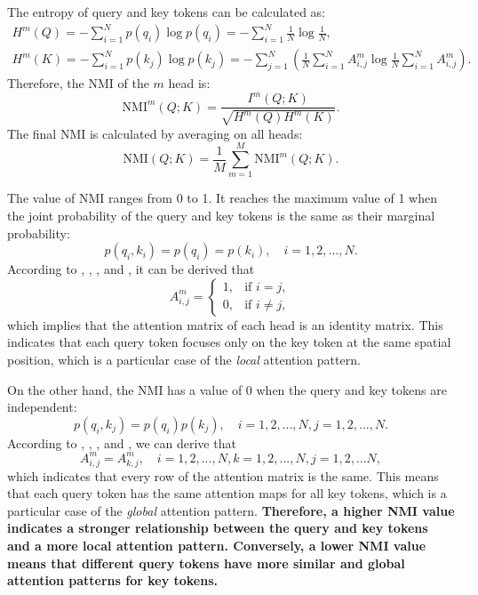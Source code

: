 The entropy of query and key tokens can be calculated as:
\begin{gather}
    H^m(Q)=-\sum_{i=1}^N p(q_i)\log{p(q_i)}=-\sum_{i=1}^N\frac{1}{N}\log{\frac{1}{N}}, \\
    H^m(K)=-\sum_{i=1}^N p(k_j)\log{p(k_j)}=-\sum_{j=1}^N\left(\frac{1}{N}\sum_{i=1}^NA_{i,j}^m\log{\frac{1}{N}\sum_{i=1}^NA_{i,j}^m}\right).
\end{gather}
Therefore, the NMI of the $m$ head is:
\begin{equation}
    \text{NMI}^m(Q;K)=\frac{I^m(Q;K)}{\sqrt{H^m(Q)H^m(K)}}.
\end{equation}
The final NMI is calculated by averaging on all heads:
\begin{equation}
    \text{NMI}(Q;K)=\frac{1}{M}\sum_{m=1}^M \text{NMI}^m(Q;K).
\end{equation}

The value of NMI ranges from 0 to 1. It reaches the maximum value of 1 when the joint probability of the query and key tokens is the same as their marginal probability:
\begin{equation}
    p(q_i,k_i)=p(q_i)=p(k_i), \quad i=1,2,...,N.
    \label{eq:nmi_1}
\end{equation}
According to , , , and , it can be derived that
\begin{equation}
A^m_{i,j}=
\begin{cases} 
1, & \mbox{if }i=j, \\
0, & \mbox{if }i\neq j,
\end{cases}
\end{equation}
which implies that the attention matrix of each head is an identity matrix. This indicates that each query token focuses only on the key token at the same spatial position, which is a particular case of the \textit{local} attention pattern.

On the other hand, the NMI has a value of 0 when the query and key tokens are independent:
\begin{equation}
    p(q_i,k_j)=p(q_i)p(k_j), \quad i=1,2,...,N, j=1,2,...,N.
    \label{eq:nmi_0}
\end{equation}
According to , , , and , we can derive that
\begin{equation}
    A^m_{i,j}=A^m_{k,j}, \quad i=1,2,...,N, k=1,2,...,N, j=1,2,...N,
\end{equation}
which indicates that every row of the attention matrix is the same. This means that each query token has the same attention maps for all key tokens, which is a particular case of the \textit{global} attention pattern.
\textbf{Therefore, a higher NMI value indicates a stronger relationship between the query and key tokens and a more local attention pattern. Conversely, a lower NMI value means that different query tokens have more similar and global attention patterns for key tokens.}




